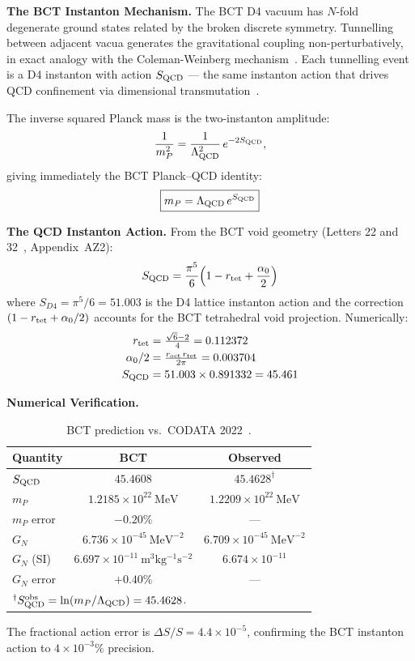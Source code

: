 \documentclass[aps,prl,twocolumn,superscriptaddress,floatfix]{revtex4-2}
\begin{document}
\medskip
\noindent\textbf{The BCT Instanton Mechanism.}
The BCT D4 vacuum has $N$-fold degenerate ground states related by the broken
discrete symmetry. Tunnelling between adjacent vacua generates the gravitational
coupling non-perturbatively, in exact analogy with the Coleman-Weinberg
mechanism~\cite{ColemanWeinberg}. Each tunnelling event is a D4 instanton
with action $S_{\rm QCD}$ — the same instanton action that drives QCD
confinement via dimensional transmutation~\cite{L22}.

The inverse squared Planck mass is the two-instanton amplitude:
\begin{equation}
  \frac{1}{m_P^2} = \frac{1}{\Lambda_{\rm QCD}^2}\,e^{-2S_{\rm QCD}},
  \label{eq:GN_inst}
\end{equation}
giving immediately the BCT Planck--QCD identity:
\begin{equation}
  \boxed{m_P = \Lambda_{\rm QCD}\,e^{S_{\rm QCD}}}
  \label{eq:mP}
\end{equation}

\medskip
\noindent\textbf{The QCD Instanton Action.}
From the BCT void geometry (Letters 22 and 32~\cite{L22,L32}, Appendix~AZ2):
\begin{equation}
  S_{\rm QCD} = \frac{\pi^5}{6}\!\left(1 - r_{\rm tet} + \frac{\alpha_0}{2}\right)
  \label{eq:SQCD}
\end{equation}
where $S_{D4} = \pi^5/6 = 51.003$ is the D4 lattice instanton action
and the correction $(1 - r_{\rm tet} + \alpha_0/2)$ accounts for the
BCT tetrahedral void projection. Numerically:
\begin{align}
  r_{\rm tet} &= \tfrac{\sqrt{6}-2}{4} = 0.112372 \label{eq:rtet} \\
  \alpha_0/2 &= \tfrac{r_{\rm oct}\,r_{\rm tet}}{2\pi} = 0.003704 \label{eq:a0} \\
  S_{\rm QCD} &= 51.003 \times 0.891332 = 45.461 \label{eq:SQCDnum}
\end{align}

\medskip
\noindent\textbf{Numerical Verification.}
\begin{table}[h]
\centering
\caption{BCT prediction vs.\ CODATA 2022~\cite{CODATA2022}.}
\label{tab:GN}
\begin{tabular}{lcc}
\toprule
Quantity & BCT & Observed \\
\midrule
$S_{\rm QCD}$ & $45.4608$ & $45.4628^\dagger$ \\
$m_P$ & $1.2185\times10^{22}\ \mathrm{MeV}$ & $1.2209\times10^{22}\ \mathrm{MeV}$ \\
$m_P$ error & $-0.20\%$ & — \\
$G_N$ & $6.736\times10^{-45}\ \mathrm{MeV}^{-2}$ & $6.709\times10^{-45}\ \mathrm{MeV}^{-2}$ \\
$G_N$ (SI) & $6.697\times10^{-11}\ \mathrm{m^3kg^{-1}s^{-2}}$ & $6.674\times10^{-11}$ \\
$G_N$ error & $+0.40\%$ & — \\
\bottomrule
\multicolumn{3}{l}{$^\dagger S^{\rm obs}_{\rm QCD} = \ln(m_P/\Lambda_{\rm QCD}) = 45.4628$.}
\end{tabular}
\end{table}
The fractional action error is $\Delta S/S = 4.4\times10^{-5}$, confirming
the BCT instanton action to $4\times10^{-3}\%$ precision.
\end{document}
